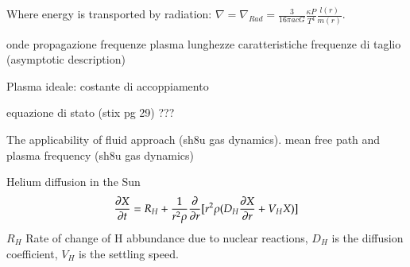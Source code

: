 \begin{itemize*}
\item Where energy is transported by radiation: $\nabla=\nabla_{Rad}=\frac{3}{16\pi acG}\frac{\kappa P}{T^4}\frac{l(r)}{m(r)}$.
\item onde propagazione frequenze plasma lunghezze caratteristiche frequenze di taglio (asymptotic description)
\item Plasma ideale: costante di accoppiamento
\item equazione di stato (stix pg 29) ???
\item The applicability of fluid approach (sh8u gas dynamics). mean free path and plasma frequency (sh8u gas dynamics)
\item Helium diffusion in the Sun
\begin{equation*}
    \PDy{t}{X}=R_H+\frac{1}{r^2\rho}\PDof{r}[r^2\rho(D_H\PDy{r}{X}+V_HX)]
\end{equation*}
$R_H$ Rate of change of H abbundance due to nuclear reactions, $D_H$ is the diffusion coefficient, $V_H$ is the settling speed.

\end{itemize*}

\stopcontents[chapters]
